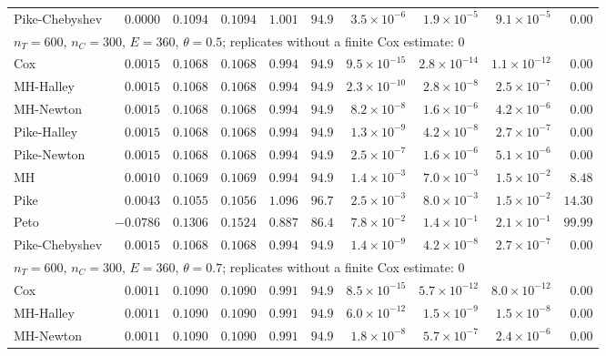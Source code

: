 \begin{landscape}
\begin{longtable}{lrrrrrrrrr}
Pike-Chebyshev & $0.0000$ & $0.1094$ & $0.1094$ & $1.001$ & $94.9$ & $3.5 \times 10^{-6}$ & $1.9 \times 10^{-5}$ & $9.1 \times 10^{-5}$ & $0.00$ \\
\multicolumn{10}{l}{$n_T = 600$, $n_C = 300$, $E = 360$, $\theta = 0.5$; replicates without a finite Cox estimate: 0} \\
Cox & $0.0015$ & $0.1068$ & $0.1068$ & $0.994$ & $94.9$ & $9.5 \times 10^{-15}$ & $2.8 \times 10^{-14}$ & $1.1 \times 10^{-12}$ & $0.00$ \\
MH-Halley & $0.0015$ & $0.1068$ & $0.1068$ & $0.994$ & $94.9$ & $2.3 \times 10^{-10}$ & $2.8 \times 10^{-8}$ & $2.5 \times 10^{-7}$ & $0.00$ \\
MH-Newton & $0.0015$ & $0.1068$ & $0.1068$ & $0.994$ & $94.9$ & $8.2 \times 10^{-8}$ & $1.6 \times 10^{-6}$ & $4.2 \times 10^{-6}$ & $0.00$ \\
Pike-Halley & $0.0015$ & $0.1068$ & $0.1068$ & $0.994$ & $94.9$ & $1.3 \times 10^{-9}$ & $4.2 \times 10^{-8}$ & $2.7 \times 10^{-7}$ & $0.00$ \\
Pike-Newton & $0.0015$ & $0.1068$ & $0.1068$ & $0.994$ & $94.9$ & $2.5 \times 10^{-7}$ & $1.6 \times 10^{-6}$ & $5.1 \times 10^{-6}$ & $0.00$ \\
MH & $0.0010$ & $0.1069$ & $0.1069$ & $0.994$ & $94.9$ & $1.4 \times 10^{-3}$ & $7.0 \times 10^{-3}$ & $1.5 \times 10^{-2}$ & $8.48$ \\
Pike & $0.0043$ & $0.1055$ & $0.1056$ & $1.096$ & $96.7$ & $2.5 \times 10^{-3}$ & $8.0 \times 10^{-3}$ & $1.5 \times 10^{-2}$ & $14.30$ \\
Peto & $-0.0786$ & $0.1306$ & $0.1524$ & $0.887$ & $86.4$ & $7.8 \times 10^{-2}$ & $1.4 \times 10^{-1}$ & $2.1 \times 10^{-1}$ & $99.99$ \\
Pike-Chebyshev & $0.0015$ & $0.1068$ & $0.1068$ & $0.994$ & $94.9$ & $1.4 \times 10^{-9}$ & $4.2 \times 10^{-8}$ & $2.7 \times 10^{-7}$ & $0.00$ \\
\multicolumn{10}{l}{$n_T = 600$, $n_C = 300$, $E = 360$, $\theta = 0.7$; replicates without a finite Cox estimate: 0} \\
Cox & $0.0011$ & $0.1090$ & $0.1090$ & $0.991$ & $94.9$ & $8.5 \times 10^{-15}$ & $5.7 \times 10^{-12}$ & $8.0 \times 10^{-12}$ & $0.00$ \\
MH-Halley & $0.0011$ & $0.1090$ & $0.1090$ & $0.991$ & $94.9$ & $6.0 \times 10^{-12}$ & $1.5 \times 10^{-9}$ & $1.5 \times 10^{-8}$ & $0.00$ \\
MH-Newton & $0.0011$ & $0.1090$ & $0.1090$ & $0.991$ & $94.9$ & $1.8 \times 10^{-8}$ & $5.7 \times 10^{-7}$ & $2.4 \times 10^{-6}$ & $0.00$ \\

\end{longtable}
\end{landscape}
